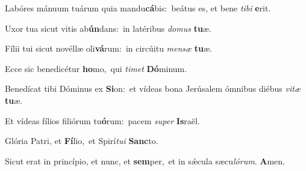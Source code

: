 Labóres mánuum tuárum quia mandu\textbf{cá}bis:~\redgreheightstar beátus es, et bene \textit{ti}\textit{bi} \textbf{e}rit.

Uxor tua sicut vitis ab\textbf{ún}dans:~\redgreheightstar in latéribus \textit{do}\textit{mus} \textbf{tu}æ.

Fílii tui sicut novéllæ oli\textbf{vá}rum:~\redgreheightstar in circúitu \textit{men}\textit{sæ} \textbf{tu}æ.

Ecce sic benedicétur \textbf{ho}mo,~\redgreheightstar qui \textit{ti}\textit{met} \textbf{Dó}minum.

Benedícat tibi Dóminus ex \textbf{Si}on:~\redgreheightstar et vídeas bona Jerúsalem ómnibus diébus \textit{vi}\textit{tæ} \textbf{tu}æ.

Et vídeas fílios filiórum tu\textbf{ó}rum:~\redgreheightstar pacem \textit{su}\textit{per} \textbf{Is}raël.

Glória Patri, et \textbf{Fí}lio,~\redgreheightstar et Spirí\textit{tu}\textit{i} \textbf{Sanc}to.

Sicut erat in princípio, et nunc, et \textbf{sem}per,~\redgreheightstar et in sǽcula sæcu\textit{ló}\textit{rum}. \textbf{A}men.

